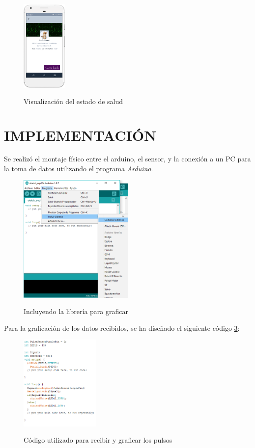 \documentclass[letterpaper, 10 pt, conference]{ieeeconf}  %
\begin{document}
\begin{figure}
\centering
\includegraphics[width=0.2\textwidth]{HC5.PNG}
\label{fig:viewingHeart}
\caption{Visualizaci\'on del estado de salud}
\end{figure}

\section{IMPLEMENTACI\'ON}

Se realiz\'o el montaje f\'isico entre el arduino, el sensor, y la conexi\'on a un PC para la toma de datos utilizando el programa \textit{Arduino}.

\begin{figure}
\centering
\includegraphics[width=0.5\textwidth]{includeLibrary.png}
\label{fig:library}
\caption{Incluyendo la librer\'ia para graficar}
\end{figure}

Para la graficaci\'on de los datos recibidos, se ha dise\~nado el siguiente c\'odigo \ref{fig:code}:

\begin{figure}
\centering
\includegraphics[width=0.35\textwidth]{codeArduino.png}
\label{fig:code}
\caption{C\'odigo utilizado para recibir y graficar los pulsos}
\end{figure}
\end{document}
